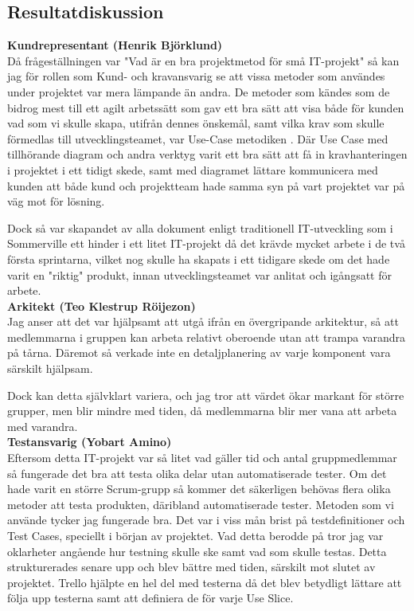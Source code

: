 \documentclass[conference,a4paper]{IEEEtran}
\begin{document}
\subsection{Resultatdiskussion}

\noindent \textbf{Kundrepresentant (Henrik Björklund)}\\
Då frågeställningen var "Vad är en bra projektmetod för små IT-projekt" så kan jag för rollen som Kund- och kravansvarig se att vissa metoder som användes under projektet var mera lämpande än andra. De metoder som kändes som de bidrog mest till ett agilt arbetssätt som gav ett bra sätt att visa både för kunden vad som vi skulle skapa, utifrån dennes önskemål, samt vilka krav som skulle förmedlas till utvecklingsteamet, var Use-Case metodiken \cite{Jacobson11}.
Där Use Case med tillhörande diagram och andra verktyg varit ett bra sätt att få in kravhanteringen i projektet i ett tidigt skede, samt med diagramet lättare kommunicera med kunden att både kund och projektteam hade samma syn på vart projektet var på väg mot för lösning.

Dock så var skapandet av alla dokument enligt traditionell IT-utveckling som i Sommerville \cite{Sommerville10} ett hinder i ett litet IT-projekt då det krävde mycket arbete i de två första sprintarna, vilket nog skulle ha skapats i ett tidigare skede om det hade varit en "riktig" produkt, innan utvecklingsteamet var anlitat och igångsatt för arbete.
\\

\noindent \textbf{Arkitekt (Teo Klestrup Röijezon)}\\
Jag anser att det var hjälpsamt att utgå ifrån en övergripande arkitektur, så att medlemmarna i gruppen kan arbeta relativt oberoende utan att trampa varandra på tårna. Däremot så verkade inte en detaljplanering av varje komponent vara särskilt hjälpsam.

Dock kan detta självklart variera, och jag tror att värdet ökar markant för större grupper, men blir mindre med tiden, då medlemmarna blir mer vana att arbeta med varandra.
\\

\noindent \textbf{Testansvarig (Yobart Amino)}\\
Eftersom detta IT-projekt var så litet vad gäller tid och antal gruppmedlemmar så fungerade det bra att testa olika delar utan automatiserade tester. Om det hade varit en större Scrum-grupp så kommer det säkerligen behövas flera olika metoder att testa produkten, däribland automatiserade tester. Metoden som vi använde tycker jag fungerade bra. Det var i viss mån brist på testdefinitioner och Test Cases, speciellt i början av projektet. Vad detta berodde på tror jag var oklarheter angående hur testning skulle ske samt vad som skulle testas. Detta strukturerades senare upp och blev bättre med tiden, särskilt mot slutet av projektet. Trello hjälpte en hel del med testerna då det blev betydligt lättare att följa upp testerna samt att definiera de för varje Use Slice. 
\end{document}
